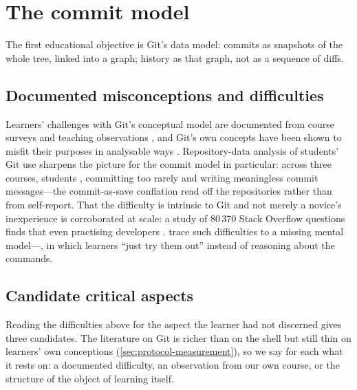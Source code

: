 \mode*
\section{The commit model}
\label{sec:model}

The first educational objective is Git's data model: commits as snapshots
of the whole tree, linked into a graph; history as that graph, not as a
sequence of diffs.

\subsection{Documented misconceptions and difficulties}

Learners' challenges with Git's conceptual model are documented from course
surveys and teaching observations \autocite{IsomottonenCochez2014}, and
Git's own concepts have been shown to misfit their purposes in analysable
ways \autocite{DeRossoJackson2016Gitless}.
Repository-data analysis of students' Git use sharpens the picture for the
commit model in particular: across three courses, students
, committing too rarely and writing meaningless commit
messages---the commit-as-save conflation read off the repositories rather
than from self-report.
That the difficulty is intrinsic to Git and not merely a novice's
inexperience is corroborated at scale: a study of 80\,370 Stack Overflow
questions finds that even practising developers
.
\Textcite{IsomottonenCochez2014} trace such difficulties to a missing mental
model---, in which learners
\enquote{just try them out} instead of reasoning about the commands.

\subsection{Candidate critical aspects}
\label{sec:model-aspects}

Reading the difficulties above for the aspect the learner had not
discerned gives three candidates.
The literature on Git is richer than on the shell but still thin on
learners' own conceptions (\cref{sec:protocol-measurement}), so we say
for each what it rests on: a documented difficulty, an observation from
our own course, or the structure of the object of learning itself.


